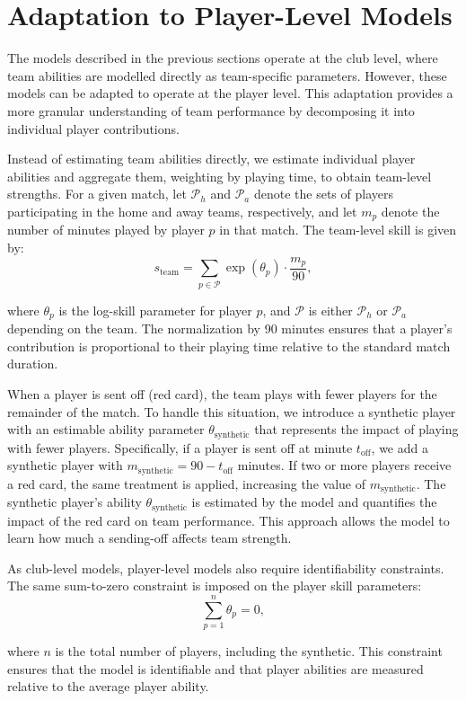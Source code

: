 \section{Adaptation to Player-Level Models}
\label{sec:player_level_adaptation}

The models described in the previous sections operate at the club level, where team abilities are modelled directly as team-specific parameters.
However, these models can be adapted to operate at the player level.
This adaptation provides a more granular understanding of team performance by decomposing it into individual player contributions.

Instead of estimating team abilities directly, we estimate individual player abilities and aggregate them, weighting by playing time, to obtain team-level strengths.
For a given match, let $\mathcal{P}_h$ and $\mathcal{P}_a$ denote the sets of players participating in the home and away teams, respectively, and let $m_p$ denote the number of minutes played by player $p$ in that match.
The team-level skill is given by:
\begin{equation}
    \label{eq:team_skill_aggregation}
    s_{\text{team}} = \sum_{p \in \mathcal{P}} \exp(\theta_p) \cdot \frac{m_p}{90},
\end{equation}

\noindent where $\theta_p$ is the log-skill parameter for player $p$, and $\mathcal{P}$ is either $\mathcal{P}_h$ or $\mathcal{P}_a$ depending on the team.
The normalization by 90 minutes ensures that a player's contribution is proportional to their playing time relative to the standard match duration.

When a player is sent off (red card), the team plays with fewer players for the remainder of the match.
To handle this situation, we introduce a synthetic player with an estimable ability parameter $\theta_{\text{synthetic}}$ that represents the impact of playing with fewer players.
Specifically, if a player is sent off at minute $t_{\text{off}}$, we add a synthetic player with $m_{\text{synthetic}} = 90 - t_{\text{off}}$ minutes.
If two or more players receive a red card, the same treatment is applied, increasing the value of $m_{\text{synthetic}}$.
The synthetic player's ability $\theta_{\text{synthetic}}$ is estimated by the model and quantifies the impact of the red card on team performance.
This approach allows the model to learn how much a sending-off affects team strength.

As club-level models, player-level models also require identifiability constraints.
The same sum-to-zero constraint is imposed on the player skill parameters:
\begin{equation}
    \label{eq:player_sum_zero_constraint}
    \sum_{p=1}^{n} \theta_p = 0,
\end{equation}

\noindent where $n$ is the total number of players, including the synthetic.
This constraint ensures that the model is identifiable and that player abilities are measured relative to the average player ability.
